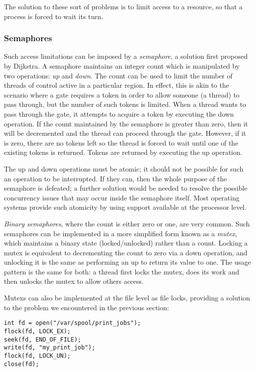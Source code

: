 The solution to these sort of problems is to limit access to a
resource, so that a process is forced to wait its turn.

\subsubsection{Semaphores}

Such access limitations can be imposed by a \emph{semaphore}, a
solution first proposed by Dijkstra\cite{semaphore}.  A semaphore
maintains an integer count which is manipulated by two operations:
\emph{up} and \emph{down}.  The count can be used to limit the number
of threads of control active in a particular region.  In effect, this
is akin to the scenario where a gate requires a token in order to
allow someone (a thread) to pass through, but the number of such
tokens is limited.  When a thread wants to pass through the gate, it
attempts to acquire a token by executing the down operation.  If the
count maintained by the semaphore is greater than zero, then it will
be decremented and the thread can proceed through the gate.  However,
if it is zero, there are no tokens left so the thread is forced to
wait until one of the existing tokens is returned.  Tokens are
returned by executing the up operation.

The up and down operations must be atomic; it should not be possible
for such an operation to be interrupted.  If they can, then the whole
purpose of the semaphore is defeated; a further solution would be
needed to resolve the possible concurrency issues that may occur
inside the semaphore itself.  Most operating systems provide such
atomicity by using support available at the processor level.

\emph{Binary semaphores}, where the count is either zero or one, are
very common.  Such semaphores can be implemented in a more simplified
form known as a \emph{mutex}, which maintains a binary state
(locked/unlocked) rather than a count.  Locking a mutex is equivalent
to decrementing the count to zero via a down operation, and unlocking
it is the same as performing an up to return its value to one.  The
usage pattern is the same for both: a thread first locks the mutex,
does its work and then unlocks the mutex to allow others access.

Mutexs can also be implemented at the file level as file locks,
providing a solution to the problem we encountered in the previous
section:

\begin{verbatim}
int fd = open("/var/spool/print_jobs");
flock(fd, LOCK_EX);
seek(fd, END_OF_FILE);
write(fd, "my_print_job");
flock(fd, LOCK_UN);
close(fd);
\end{verbatim}

